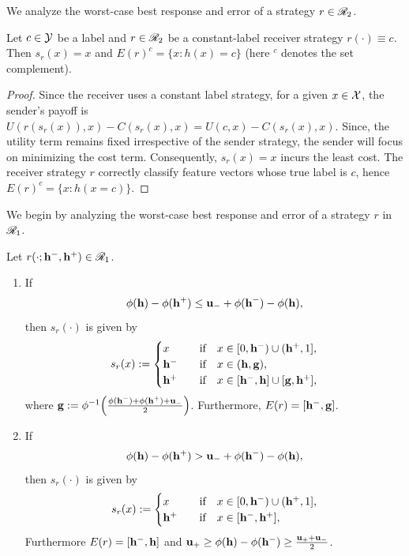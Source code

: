 We analyze the worst-case best response and error of a strategy $r \in \mathscr{R}_2$.

\begin{lem}\label{lem:constant strategy}
	Let $c \in \mathcal{Y}$ be a label and $r \in \mathscr{R}_2$ be a constant-label  receiver strategy $r(\cdot) \equiv c$. Then $s_r(x) = x$ and $E(r)^c = \{x: h(x) =c\}$ (here $^c$ denotes the set complement).
\end{lem}

\begin{proof}
	Since the receiver uses a constant label strategy, for a given $x \in \mathcal{X}$, the sender's payoff is $U(r(s_r(x)),x) - C(s_r(x),x) = U(c,x) - C(s_r(x),x)$.
	Since, the utility term remains fixed irrespective of the sender strategy, the sender will focus on minimizing the cost term. Consequently, $s_r(x) = x$ incurs the least cost. The receiver strategy $r$ correctly classify feature vectors whose true label is $c$, hence $E(r)^c = \{x:h(x = c)\}$.
\end{proof}


We begin by analyzing the worst-case best response and error of a strategy $r$ in $\mathscr{R}_1$.
\begin{lem}\label{lem:Best response r1}
	Let $r(\cdot;\mathbf{h^{-}},\mathbf{h^{+}}) \in \mathscr{R}_1$.
	\begin{enumerate}[label=(\alph*)]
		\item If \[\phi(\mathbf{h}) - \phi(\mathbf{h^{+}}) \leq \mathbf{u_-} + \phi(\mathbf{h^{-}}) - \phi(\mathbf{h}),\]
			then $s_r(\cdot)$ is given by
		\begin{equation*}
			s_r(x) := \begin{cases}
				x & \hbox{\quad if\quad} x \in [0,\mathbf{h^{-}}) \cup (\mathbf{h^{+}},1], \\
				\mathbf{h^{-}} & \hbox{\quad if\quad} x \in (\mathbf{h},\mathbf{g}), \\
				\mathbf{h^{+}} & \hbox{\quad if\quad}x \in [\mathbf{h^{-}},\mathbf{h}] \cup [\mathbf{g},\mathbf{h^{+}}],
			\end{cases}
		\end{equation*}
		where $\mathbf{g} := \phi^{-1}\Big(\frac{\phi(\mathbf{h^{-}}) + \phi(\mathbf{h^{+}}) + \mathbf{u_-}}{2}\Big)$. Furthermore, $E(r) = [\mathbf{h^{-}},\mathbf{g}]$.
		\item If \[\phi(\mathbf{h}) - \phi(\mathbf{h^{+}}) > \mathbf{u_-} + \phi(\mathbf{h^{-}}) - \phi(\mathbf{h}),\]
		then $s_r(\cdot)$ is given by
		\begin{equation*}
			s_r(x) := \begin{cases}
				x & \hbox{\quad if\quad} x \in [0,\mathbf{h^{-}}) \cup (\mathbf{h^{+}},1], \\
				\mathbf{h^{+}} & \hbox{\quad if\quad}x \in [\mathbf{h^{-}},\mathbf{h^{+}}],
			\end{cases}
		\end{equation*}
\noindent Furthermore $E(r) = [\mathbf{h^{-}},\mathbf{h}]$ and $\mathbf{u_+} \geq \phi(\mathbf{h}) - \phi(\mathbf{h^{-}}) \geq \frac{\mathbf{u_+} + \mathbf{u_-}}{2}$.
	\end{enumerate}
\end{lem}


